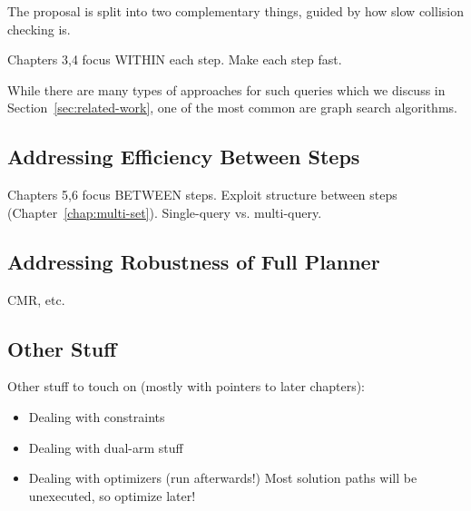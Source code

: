 The proposal is split into two complementary things,
guided by how slow collision checking is.

Chapters 3,4 focus WITHIN each step.
Make each step fast.

While there are many types of approaches for such queries
which we discuss in Section~\ref{sec:related-work},
one of the most common are graph search algorithms.

\subsection{Addressing Efficiency Between Steps}

Chapters 5,6 focus BETWEEN steps.
Exploit structure between steps (Chapter~\ref{chap:multi-set}).
Single-query vs. multi-query.

\subsection{Addressing Robustness of Full Planner}

CMR, etc.

\subsection{Other Stuff}

Other stuff to touch on
(mostly with pointers to later chapters):
\begin{itemize}
\item Dealing with constraints
\item Dealing with dual-arm stuff
\item Dealing with optimizers (run afterwards!)
   Most solution paths will be unexecuted, so optimize later!
\end{itemize}
